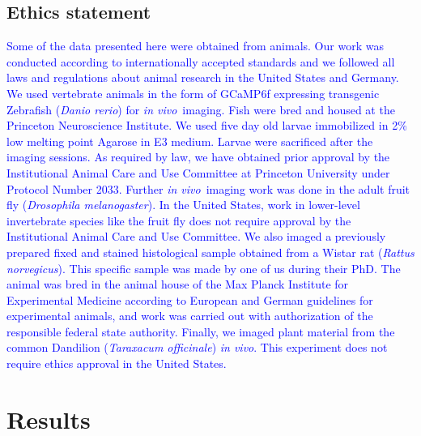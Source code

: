 \documentclass[10pt,letterpaper]{article}
\newcommand{\invivo}{\textit{in vivo}~}
\begin{document}
\subsection*{Ethics statement}
\textcolor{blue}{Some of the data presented here were obtained from animals. Our work was conducted according to internationally accepted standards and we followed all laws and regulations about animal research in the United States and Germany. We used vertebrate animals in the form of GCaMP6f expressing transgenic Zebrafish (\textit{Danio rerio}) for \invivo imaging. Fish were bred and housed at the Princeton Neuroscience Institute. We used five day old larvae immobilized in 2\% low melting point Agarose in E3 medium. Larvae were sacrificed after the imaging sessions. As required by law, we have obtained prior approval by the Institutional Animal Care and Use Committee at Princeton University under Protocol Number 2033. Further \invivo imaging work was done in the adult fruit fly (\textit{Drosophila melanogaster}). In the United States, work in lower-level invertebrate species like the fruit fly does not require approval by the Institutional Animal Care and Use Committee. We also imaged a previously prepared fixed and stained histological sample obtained from a Wistar rat (\textit{Rattus norvegicus}). This specific sample was made by one of us during their PhD\cite{Schottdorf2018}. The animal was bred in the animal house of the Max Planck Institute for Experimental Medicine according to European and German guidelines for experimental animals, and work was carried out with authorization of the responsible federal state authority. Finally, we imaged plant material from the common Dandilion (\textit{Taraxacum officinale}) \textit{in vivo}. This experiment does not require ethics approval in the United States.}

\section*{Results}
\end{document}
